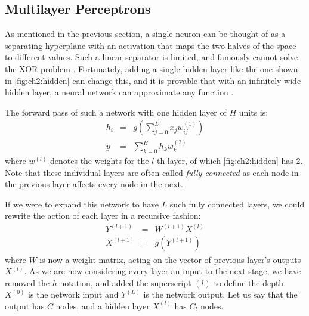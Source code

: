 \subsection{Multilayer Perceptrons}
As mentioned in the previous section, a single neuron can be thought of as a
separating hyperplane with an activation that maps the two halves of the space
to different values. Such a linear separator is limited, and famously cannot
solve the XOR problem \cite{minsky_perceptrons:_1988}. Fortunately, adding a
single hidden layer like the one shown in \autoref{fig:ch2:hidden} can change
this, and it is provable that with an infinitely wide hidden layer, a neural
network can approximate any function \cite{hornik_multilayer_1989,
cybenko_approximation_1989}. 

The forward pass of such a network with one hidden layer of $H$ units is:
%
\begin{eqnarray}
  h_i & = & g\left(\sum_{j=0}^{D} x_j w_{ij}^{(1)}\right) \\
  y & = & \sum_{k=0}^{H} h_k w^{(2)}_{k}
\end{eqnarray}
%
where $w^{(l)}$ denotes the weights for the $l$-th layer, of which
\autoref{fig:ch2:hidden} has 2. Note that these individual layers are often
called \emph{fully connected} as each node in the previous layer affects every
node in the next.

If we were to expand this network to have $L$ such fully connected layers, we
could rewrite the action of each layer in a recursive fashion:
%
\begin{eqnarray}
  Y^{(l+1)} &=& W^{(l+1)}X^{(l)}  \label{eq:ch2:fc1}\\
  X^{(l+1)} &=& g\left(Y^{(l+1)}\right) \label{eq:ch2:fc2} 
\end{eqnarray}
where $W$ is now a weight matrix, acting on the vector of previous layer's
outputs $X^{(l)}$. As we are now considering every layer an input to the next
stage, we have removed the $h$ notation, and added the superscript $(l)$ to
define the depth. $X^{(0)}$ is the network input and $Y^{(L)}$ is the network
output. Let us say that the output has $C$ nodes, and a hidden layer $X^{(l)}$
has $C_l$ nodes.

\begin{figure}[t]
  \centering
  
  \label{fig:ch2:hidden}
\end{figure}

